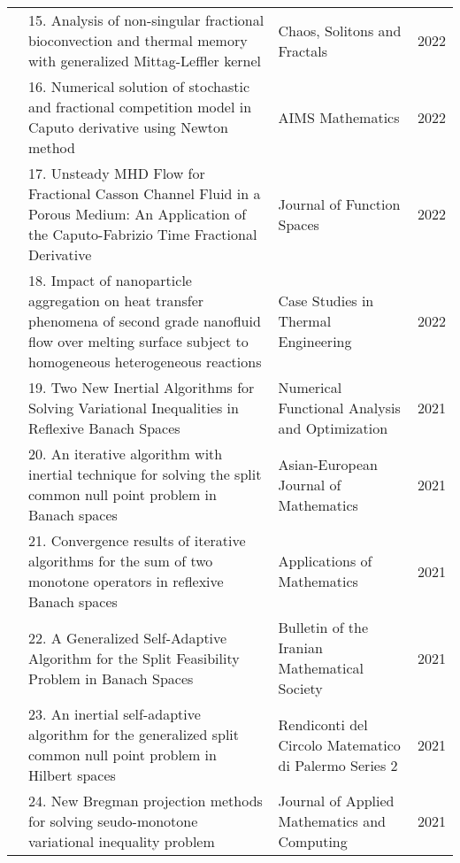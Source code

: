 {{\begin{center}
\begin{longtable}{|p{}|>{\raggedright}p{}|>{\raggedright}p{}|p{}|}
&15.	Analysis of non-singular
fractional bioconvection 
and thermal memory 
with generalized Mittag-Leffler kernel				
&Chaos, Solitons and Fractals
&2022 
\\ \cline{2-4}	

&16. Numerical solution \newline of
stochastic and fractional 
competition model in
Caputo derivative using 
Newton method
&AIMS Mathematics
&2022 \\ \cline{2-4}	

&17. Unsteady MHD Flow for
Fractional Casson Channel
Fluid in a Porous Medium:
An Application of the Caputo-Fabrizio Time  Fractional Derivative
&Journal of Function Spaces
&2022\\ \cline{2-4}	

&18. Impact of nanoparticle
aggregation on heat
transfer phenomena of 
second grade nanofluid
flow over melting surface
subject to homogeneous
heterogeneous reactions			
&Case Studies in Thermal Engineering
&2022\\\cline{2-4}

&19. Two New Inertial \newline
Algorithms for Solving 
Variational Inequalities in 
Reflexive Banach Spaces
&Numerical Functional Analysis 
and Optimization
&2021  \\ \cline{2-4}

&20. An iterative algorithm
with inertial technique
for solving the split
common null point problem 
in Banach spaces
&Asian-European Journal of Mathematics
&2021 \\ \cline{2-4}		

&21. Convergence results of 
iterative algorithms for 
the sum of two monotone 
operators in reflexive 
Banach spaces					
&Applications of Mathematics
&2021 \\ \cline{2-4}

&22. A Generalized Self-\newline Adaptive Algorithm for
the Split Feasibility
Problem in Banach Spaces
&Bulletin of the Iranian Mathematical Society		
&2021 \\ \cline{2-4}
	
&23. An inertial self-adaptive
algorithm for the 
generalized split common
null point problem in
Hilbert spaces			
&Rendiconti del
Circolo Matematico
di Palermo Series 2
&2021\\ \cline{2-4}	

&24. New Bregman \newline projection
methods for solving 
seudo-monotone
variational inequality
problem
&Journal of Applied Mathematics 
and Computing
&2021 \\ \cline{2-4}
	

\end{longtable}
\end{center}}}
